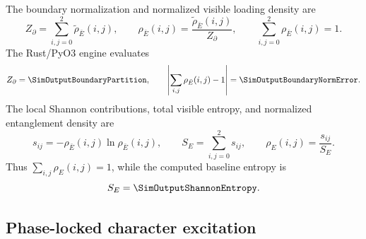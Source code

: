 The boundary normalization and normalized visible loading density are
\begin{equation}
  Z_{\partial}
  =
  \sum_{i,j=0}^{2}
  \widetilde{\rho}_{\bar E}(i,j),
  \qquad
  \rho_{\bar E}(i,j)
  =
  \frac{\widetilde{\rho}_{\bar E}(i,j)}
  {Z_{\partial}},
  \qquad
  \sum_{i,j=0}^{2}\rho_{\bar E}(i,j)=1.
  \label{eq:normalized-visible-loading}
\end{equation}
The Rust/PyO3 engine evaluates
\begin{equation}
  Z_{\partial}
  =
  \SimOutputBoundaryPartition,
  \qquad
  \left|
    \sum_{i,j}\rho_{\bar E}(i,j)-1
  \right|
  =
  \SimOutputBoundaryNormError.
  \label{eq:register-numerical-normalization}
\end{equation}
The local Shannon contributions, total visible entropy, and normalized entanglement density are
\begin{equation}
  s_{ij}
  =
  -\rho_{\bar E}(i,j)
  \ln\rho_{\bar E}(i,j),
  \qquad
  S_E
  =
  \sum_{i,j=0}^{2}s_{ij},
  \qquad
  \rho_E(i,j)
  =
  \frac{s_{ij}}{S_E}.
  \label{eq:visible-shannon-density}
\end{equation}
Thus \(\sum_{i,j}\rho_E(i,j)=1\), while the computed baseline entropy is
\begin{equation}
  S_E
  =
  \SimOutputShannonEntropy.
  \label{eq:baseline-shannon-entropy}
\end{equation}

\subsection{Phase-locked character excitation}

